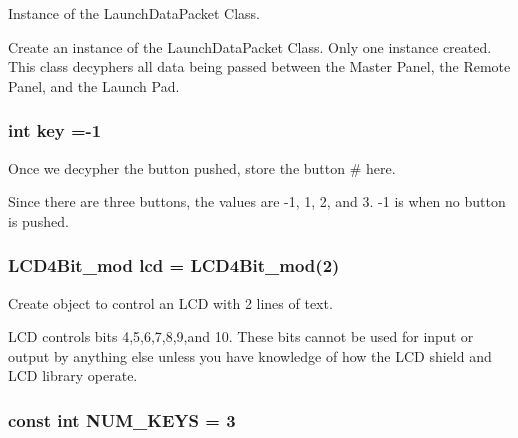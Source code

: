 Instance of the Launch\+Data\+Packet Class. 

Create an instance of the Launch\+Data\+Packet Class. Only one instance created. This class decyphers all data being passed between the Master Panel, the Remote Panel, and the Launch Pad. 
\subsubsection[{\texorpdfstring{key}{key}}]{\setlength{\rightskip}{0pt plus 5cm}int key =-\/1}\hypertarget{masterPanel_8ino_a35af0be900467fedbb610bd6ea65ed78}{}\label{masterPanel_8ino_a35af0be900467fedbb610bd6ea65ed78}


Once we decypher the button pushed, store the button \# here. 

Since there are three buttons, the values are -\/1, 1, 2, and 3. -\/1 is when no button is pushed. 
\subsubsection[{\texorpdfstring{lcd}{lcd}}]{\setlength{\rightskip}{0pt plus 5cm}L\+C\+D4\+Bit\+\_\+mod lcd = L\+C\+D4\+Bit\+\_\+mod(2)}\hypertarget{masterPanel_8ino_a41dddf59ae53b20320d0abf3498a563f}{}\label{masterPanel_8ino_a41dddf59ae53b20320d0abf3498a563f}


Create object to control an L\+CD with 2 lines of text. 

L\+CD controls bits 4,5,6,7,8,9,and 10. These bits cannot be used for input or output by anything else unless you have knowledge of how the L\+CD shield and L\+CD library operate. 
\subsubsection[{\texorpdfstring{N\+U\+M\+\_\+\+K\+E\+YS}{NUM\_KEYS}}]{\setlength{\rightskip}{0pt plus 5cm}const int N\+U\+M\+\_\+\+K\+E\+YS = 3\hspace{0.3cm}{\ttfamily [static]}}\hypertarget{masterPanel_8ino_a872c8b81f62c5a5afb73ba8e93422e1c}{}\label{masterPanel_8ino_a872c8b81f62c5a5afb73ba8e93422e1c}


